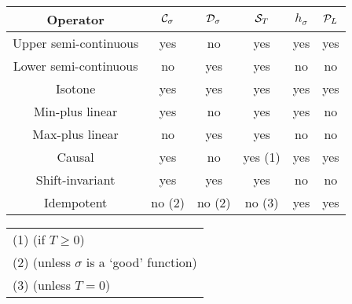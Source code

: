 \begin{table}
\begin{center}
\begin{tabular}{||c||c|c|c|c|c||}
\hline\hline
Operator    & $\mathcal C_{\sigma}$ & $\mathcal D_{\sigma}$ & $\mathcal S_T$ & $h_{\sigma}$ & $\mathcal P_L$ \\
\hline
Upper semi-continuous & yes &       no  &   yes     & yes    & yes  \\
Lower semi-continuous & no &        yes &   yes     & no     & no   \\
Isotone         & yes &     yes &   yes     & yes    & yes   \\
Min-plus linear     & yes &     no  &   yes     & yes    & no  \\
Max-plus linear     & no &      yes     &   yes     & no     & no  \\
Causal          & yes &     no  &   yes (1) & yes    & yes \\
Shift-invariant     & yes &     yes     &   yes     & no     & no \\
Idempotent              & no (2) &         no (2)     &       no (3) & yes & yes  \\
\hline \hline
\end{tabular}

\vspace{2ex}

\begin{tabular}{l}
(1) (if $T \geq 0$) \\
(2) (unless $\sigma$ is a `good' function) \\
(3) (unless $T=0$) \\
\end{tabular}
\end{center}

\end{table}
